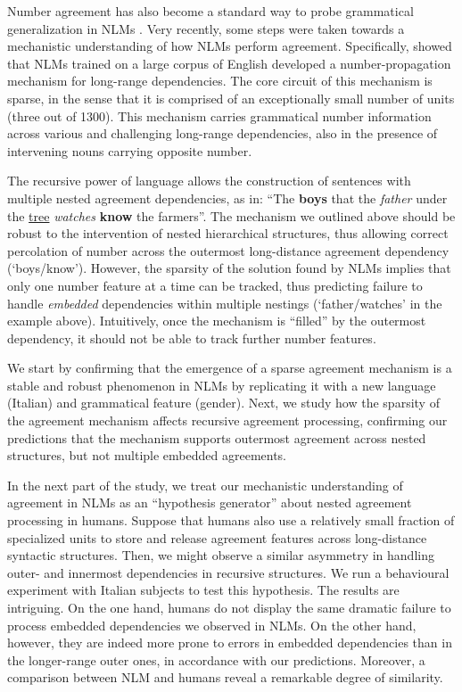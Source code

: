 Number agreement has also become a standard way to probe grammatical
generalization in NLMs \citep{Linzen:etal:2016,Bernardy:Lappin:2017,Giulianelli:etal:2018,Gulordava:etal:2018}. Very
recently, some steps were taken towards a mechanistic understanding of
how NLMs perform agreement. Specifically, \citet{lakretz2019emergence} showed that NLMs trained
on a large corpus of English developed a number-propagation mechanism for long-range dependencies. The core circuit of this mechanism is sparse, in the sense that it is comprised of an exceptionally small number of units (three out of 1300). This mechanism carries grammatical number information across various and challenging long-range dependencies, also in the presence of intervening nouns carrying opposite number.

The recursive power of language allows the construction of sentences with multiple nested agreement dependencies, as in: ``The \textbf{boys} that the \textit{father} under the \underline{tree} \textit{watches} \textbf{know} the farmers''. The mechanism we outlined above should be robust to the intervention of nested hierarchical structures, thus allowing correct percolation of number across the outermost long-distance agreement dependency (`boys/know'). However, the sparsity of the solution found by NLMs implies that only one number feature at a time can be tracked, thus predicting failure to handle \emph{embedded} dependencies within multiple nestings (`father/watches' in the example above). Intuitively, once the mechanism is ``filled'' by the outermost
dependency, it should not be able to track further number features.

We  start by confirming that the emergence of a sparse
agreement mechanism is a stable and robust phenomenon in NLMs by
replicating it with a new language (Italian) and grammatical feature
(gender). Next, we study how the sparsity of the agreement mechanism
affects recursive agreement processing, confirming our predictions
that the mechanism supports outermost agreement across nested
structures, but not multiple embedded agreements.

In the next part of the study, we treat our mechanistic understanding of
agreement in NLMs as an ``hypothesis generator''
\citep{Cichy:Kaiser:2019} about nested agreement processing in
humans. Suppose that humans  also use a relatively small fraction of specialized units
to store and release agreement features across long-distance syntactic
structures. Then, we might observe a similar asymmetry in handling
outer- and innermost dependencies in recursive structures. We run a
behavioural experiment with Italian subjects to test this
hypothesis. The results are intriguing. On the one hand, humans do
not display the same dramatic failure to process embedded dependencies we observed in NLMs. On the other hand, however, they are indeed more prone to errors in embedded dependencies than in the longer-range outer ones, in accordance with our predictions. Moreover, a comparison between NLM and humans reveal a remarkable degree of similarity. 

